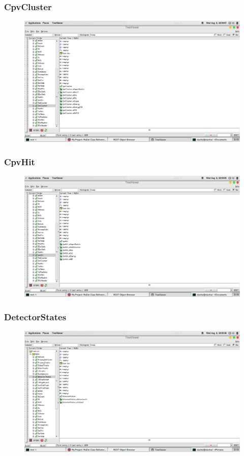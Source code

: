 \documentclass[10pt]{beamer}
\begin{document}
\begin{frame}
  \frametitle{CpvCluster}
  \begin{figure}[hbtp]
    \centering
    \includegraphics[width=\textwidth]{CpvCluster.png}
  \end{figure}
\end{frame}
\label{CpvHit}
\begin{frame}
  \frametitle{CpvHit}
  \begin{figure}[hbtp]
    \centering
    \includegraphics[width=\textwidth]{CpvHit.png}
  \end{figure}
\end{frame}
\label{DetectorStates}
\begin{frame}
  \frametitle{DetectorStates}
  \begin{figure}[hbtp]
    \centering
    \includegraphics[width=\textwidth]{DetectorStates.png}
  \end{figure}
\end{frame}
\end{document}
